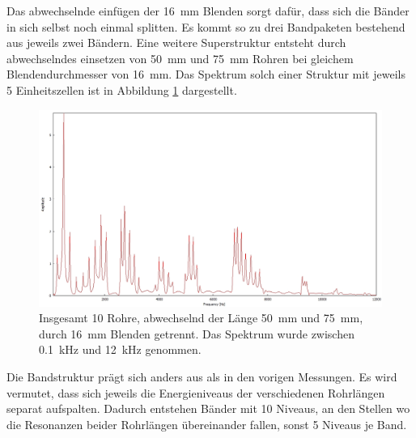 Das abwechselnde einfügen der 16~mm Blenden sorgt dafür, dass sich die Bänder in sich selbst noch einmal splitten. 
Es kommt so zu drei Bandpaketen bestehend aus jeweils zwei Bändern.
Eine weitere Superstruktur entsteht durch abwechselndes einsetzen von 50~mm und 75~mm Rohren bei gleichem Blendendurchmesser von 16~mm. Das Spektrum solch einer Struktur mit jeweils 5 Einheitszellen ist in Abbildung \ref{fig:4b_6} dargestellt.
\begin{figure}
\centering
\includegraphics[width=\textwidth]{content/messungen/Chapter4b/4b_6.jpg}
\caption{Insgesamt 10 Rohre, abwechselnd der Länge 50~mm und 75~mm, durch 16~mm Blenden getrennt. Das Spektrum wurde zwischen 0.1~kHz und 12~kHz genommen.}
\label{fig:4b_6}
\end{figure}
Die Bandstruktur prägt sich anders aus als in den vorigen Messungen.  
Es wird vermutet, dass sich jeweils die Energieniveaus der verschiedenen Rohrlängen separat aufspalten.
Dadurch entstehen Bänder mit 10 Niveaus, an den Stellen wo die Resonanzen beider Rohrlängen übereinander fallen, sonst 5 Niveaus je Band.
\FloatBarrier
